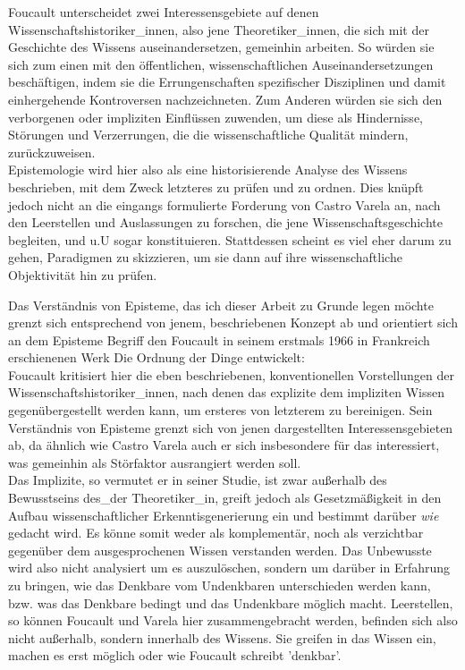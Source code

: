 Foucault unterscheidet zwei Interessensgebiete auf denen
Wissenschaftshistoriker\_innen, also jene Theoretiker\_innen, die sich mit der
Geschichte des Wissens auseinandersetzen, gemeinhin arbeiten. So würden sie sich
zum einen mit den öffentlichen, wissenschaftlichen Auseinandersetzungen
beschäftigen, indem sie die Errungenschaften spezifischer Disziplinen und damit
einhergehende Kontroversen nachzeichneten. Zum Anderen würden sie sich den
verborgenen oder impliziten Einflüssen zuwenden, um diese als Hindernisse,
Störungen und Verzerrungen, die die wissenschaftliche Qualität mindern,
zurückzuweisen.\footnotemark {} \\
Epistemologie
wird hier also als eine historisierende Analyse des Wissens beschrieben, mit dem
Zweck letzteres zu prüfen und zu ordnen.  Dies knüpft jedoch nicht an die
eingangs formulierte Forderung von Castro Varela an, nach den Leerstellen und
Auslassungen zu forschen, die jene Wissenschaftsgeschichte begleiten, und u.U
sogar konstituieren. Stattdessen scheint es viel eher darum zu gehen, Paradigmen
zu skizzieren, um sie dann auf ihre wissenschaftliche Objektivität hin zu
prüfen.

Das Verständnis von Episteme, das ich dieser Arbeit zu Grunde legen möchte
grenzt sich entsprechend von jenem, beschriebenen Konzept ab und orientiert sich
an dem Episteme Begriff den Foucault in seinem erstmals 1966 in Frankreich
erschienenen Werk \glqq Die Ordnung der Dinge\grqq \footnotemark {} entwickelt: \\

Foucault kritisiert hier die eben beschriebenen, konventionellen Vorstellungen
der Wissenschaftshistoriker\_innen, nach denen das explizite dem impliziten
Wissen gegenübergestellt werden kann, um ersteres von letzterem zu bereinigen.
Sein Verständnis von Episteme grenzt sich von jenen dargestellten
Interessensgebieten ab, da ähnlich wie Castro Varela auch er sich insbesondere
für das interessiert, was gemeinhin als Störfaktor ausrangiert werden soll. \\
Das
Implizite, so vermutet er in seiner Studie, ist zwar außerhalb des Bewusstseins
des\_der Theoretiker\_in, greift jedoch als Gesetzmäßigkeit in den Aufbau
wissenschaftlicher Erkenntisgenerierung ein und bestimmt darüber \textit{wie}
gedacht wird.\footnotemark {} 
Es könne somit weder als komplementär, noch als verzichtbar
gegenüber dem ausgesprochenen Wissen verstanden werden.\footnotemark
{} 
 Das Unbewusste wird
also nicht analysiert um es auszulöschen, sondern um darüber in Erfahrung zu
bringen, wie das Denkbare vom Undenkbaren unterschieden werden kann, bzw. was
das Denkbare bedingt und das Undenkbare möglich macht. Leerstellen, so können
Foucault und Varela hier zusammengebracht werden, befinden sich also nicht
außerhalb, sondern innerhalb des Wissens. Sie greifen in das Wissen ein, machen
es erst möglich oder wie Foucault schreibt 'denkbar'. 

